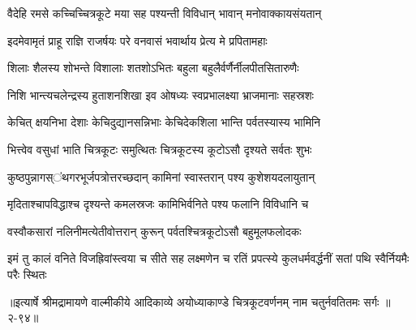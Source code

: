 \twolineshloka
{वैदेहि रमसे कच्चिच्चित्रकूटे मया सह}
{पश्यन्ती विविधान् भावान् मनोवाक्कायसंयतान्} %

\twolineshloka
{इदमेवामृतं प्राहू राज्ञि राजर्षयः परे}
{वनवासं भवार्थाय प्रेत्य मे प्रपितामहाः} %

\twolineshloka
{शिलाः शैलस्य शोभन्ते विशालाः शतशोऽभितः}
{बहुला बहुलैर्वर्णैर्नीलपीतसितारुणैः} %

\twolineshloka
{निशि भान्त्यचलेन्द्रस्य हुताशनशिखा इव}
{ओषध्यः स्वप्रभालक्ष्या भ्राजमानाः सहस्रशः} %

\twolineshloka
{केचित् क्षयनिभा देशाः केचिदुद्यानसन्निभाः}
{केचिदेकशिला भान्ति पर्वतस्यास्य भामिनि} %

\twolineshloka
{भित्त्वेव वसुधां भाति चित्रकूटः समुत्थितः}
{चित्रकूटस्य कूटोऽसौ दृश्यते सर्वतः शुभः} %

\twolineshloka
{कुष्ठपुन्नागस्ऺथगरभूर्जपत्रोत्तरच्छदान्}
{कामिनां स्वास्तरान् पश्य कुशेशयदलायुतान्} %

\twolineshloka
{मृदिताश्चापविद्धाश्च दृश्यन्ते कमलस्रजः}
{कामिभिर्वनिते पश्य फलानि विविधानि च} %

\twolineshloka
{वस्वौकसारां नलिनीमत्येतीवोत्तरान् कुरून्}
{पर्वतश्चित्रकूटोऽसौ बहुमूलफलोदकः} %

\twolineshloka
{इमं तु कालं वनिते विजह्रिवांस्त्वया च सीते सह लक्ष्मणेन च}
{रतिं प्रपत्स्ये कुलधर्मवर्द्धनीं सतां पथि स्वैर्नियमैः परैः स्थितः} %


॥इत्यार्षे श्रीमद्रामायणे वाल्मीकीये आदिकाव्ये अयोध्याकाण्डे चित्रकूटवर्णनम् नाम चतुर्नवतितमः सर्गः ॥२-९४॥
